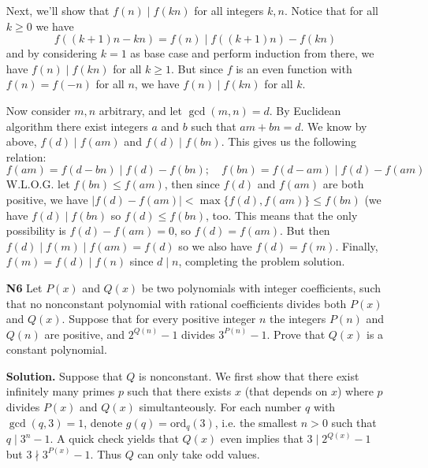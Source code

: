 \documentclass[11pt,a4paper]{article}
\begin{document}
\begin{enumerate}
    Next, we'll show that $f(n)\mid f(kn)$ for all integers $k, n$. 
    Notice that for all $k\ge 0$ we have 
    \begin{equation}
    	f((k+1)n - kn) = f(n)\mid f((k+1)n) - f(kn)
    \end{equation}
    and by considering $k=1$ as base case and perform induction from there, we have $f(n)\mid f(kn)$ for all $k\ge 1$. But since $f$ is an even function with $f(n)=f(-n)$ for all $n$, we have $f(n)\mid f(kn)$ for all $k$. 
	
	Now consider $m, n$ arbitrary, and let $\gcd(m, n)=d$. By Euclidean algorithm there exist integers $a$ and $b$ such that $am+bn=d$. We know by above, $f(d)\mid f(am)$ and $f(d)\mid f(bn)$. This gives us the following relation: 
	\[f(am)=f(d-bn)\mid f(d)-f(bn);\quad
	  f(bn)=f(d-am)\mid f(d)-f(am)
	\]
	W.L.O.G. let $f(bn)\le f(am)$, then since $f(d)$ and $f(am)$ are both positive, we have $|f(d)-f(am)|<\max\{f(d), f(am)\}\le f(bn)$ (we have $f(d)\mid f(bn)$ so $f(d)\le f(bn)$, too. This means that the only possibility is $f(d)-f(am)=0$, so $f(d)=f(am)$. But then $f(d)\mid f(m)\mid f(am)=f(d)$ so we also have $f(d)=f(m)$. Finally, $f(m)=f(d)\mid f(n)$ since $d\mid n$, completing the problem solution. 
	
	\item[\textbf{N6}]
	Let $P(x)$ and $Q(x)$ be two polynomials with integer coefficients, 
	such that no nonconstant polynomial with rational coefficients divides both $P(x)$ and $Q(x).$ 
	Suppose that for every positive integer $n$ the integers $P(n)$ and $Q(n)$ are positive, and $2^{Q(n)}-1$ divides $3^{P(n)}-1.$ 
	Prove that $Q(x)$ is a constant polynomial.
	
	\textbf{Solution.} 
	Suppose that $Q$ is nonconstant. 
	We first show that there exist infinitely many primes $p$ such that there exists $x$ (that depends on $x$) where $p$ divides $P(x)$ and $Q(x)$ simultanteously. 
	For each number $q$ with $\gcd(q, 3)=1$, denote $g(q)=\text{ord}_q(3)$, 
	i.e. the smallest $n > 0$ such that $q\mid 3^n-1$. 
	A quick check yields that $Q(x)$ even implies that $3\mid 2^{Q(x)} - 1$ but $3\nmid 3^{P(x)}-1$. 
	Thus $Q$ can only take odd values. 
	

\end{enumerate}
\end{document}
